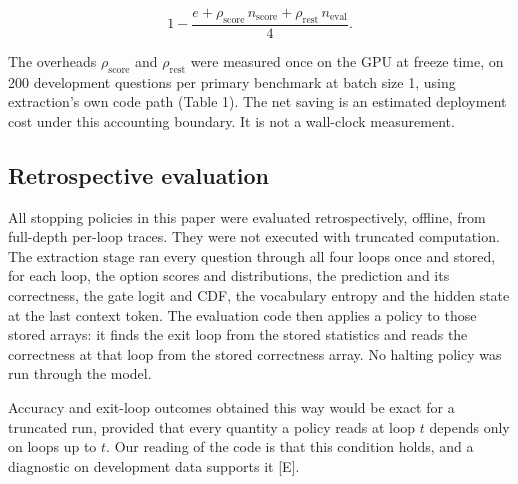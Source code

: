 \[1 - \frac{e + \rho_{\text{score}}\, n_{\text{score}} + \rho_{\text{rest}}\, n_{\text{eval}}}{4}.\]

The overheads \(\rho_{\text{score}}\) and \(\rho_{\text{rest}}\) were measured once on the GPU at freeze time, on 200 development questions per primary benchmark at batch size 1, using extraction's own code path (Table 1). The net saving is an estimated deployment cost under this accounting boundary. It is not a wall-clock measurement.

\begin{table}[t]
\centering\small
\caption{Freeze-time overhead of the probe, as a fraction of one loop's time. Measured on one GPU, batch size 1, 200 development questions per benchmark.}
\end{table}

\subsection{Retrospective evaluation}

All stopping policies in this paper were evaluated retrospectively, offline, from full-depth per-loop traces. They were not executed with truncated computation. The extraction stage ran every question through all four loops once and stored, for each loop, the option scores and distributions, the prediction and its correctness, the gate logit and CDF, the vocabulary entropy and the hidden state at the last context token. The evaluation code then applies a policy to those stored arrays: it finds the exit loop from the stored statistics and reads the correctness at that loop from the stored correctness array. No halting policy was run through the model.

Accuracy and exit-loop outcomes obtained this way would be exact for a truncated run, provided that every quantity a policy reads at loop \(t\) depends only on loops up to \(t\). Our reading of the code is that this condition holds, and a diagnostic on development data supports it {[}E{]}.

